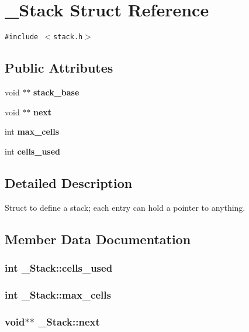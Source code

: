 \section{\_\-Stack Struct Reference}
\label{struct__Stack}
{\tt \#include $<$stack.h$>$}

\subsection*{Public Attributes}
\begin{CompactItemize}
\item 
void $\ast$$\ast$ \bf{stack\_\-base}
\item 
void $\ast$$\ast$ \bf{next}
\item 
int \bf{max\_\-cells}
\item 
int \bf{cells\_\-used}
\end{CompactItemize}


\subsection{Detailed Description}
Struct to define a stack; each entry can hold a pointer to anything. 



\subsection{Member Data Documentation}
\subsubsection{\setlength{\rightskip}{0pt plus 5cm}int \bf{\_\-Stack::cells\_\-used}}\label{struct__Stack_c175b986869e65a685664fbb51b729ad}


\subsubsection{\setlength{\rightskip}{0pt plus 5cm}int \bf{\_\-Stack::max\_\-cells}}\label{struct__Stack_d6da68f3741c4f1c3cf3f63777f21104}


\subsubsection{\setlength{\rightskip}{0pt plus 5cm}void$\ast$$\ast$ \bf{\_\-Stack::next}}\label{struct__Stack_f7c49fb7303a057ea1185161595d6346}



